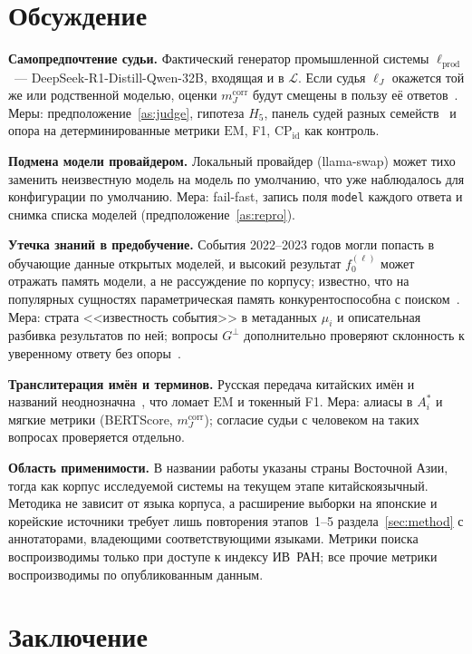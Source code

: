 \documentclass{article}
\newcommand{\Lm}{\mathcal{L}}
\newcommand{\lprod}{\ell_{\mathrm{prod}}}
\newcommand{\lJ}{\ell_{J}}
\newcommand{\refuse}{\bot}                          %
\newcommand{\EM}{\mathrm{EM}}
\newcommand{\CP}{\mathrm{CP}}
\newcommand{\mcorr}{m_J^{\mathrm{corr}}}
\begin{document}
\section{Обсуждение}\label{sec:disc}

\textbf{Самопредпочтение судьи.} Фактический генератор промышленной системы $\lprod$~--- DeepSeek-R1-Distill-Qwen-32B, входящая и в $\Lm$. Если судья $\lJ$ окажется той же или родственной моделью, оценки $\mcorr$ будут смещены в пользу её ответов~\cite{panickssery2024selfpreference,li2025preference}. Меры: предположение~\ref{as:judge}, гипотеза $H_5$, панель судей разных семейств~\cite{verga2024replacing} и опора на детерминированные метрики $\EM$, F1, $\CP_{\mathrm{id}}$ как контроль.

\textbf{Подмена модели провайдером.} Локальный провайдер (llama-swap) может тихо заменить неизвестную модель на модель по умолчанию, что уже наблюдалось для конфигурации по умолчанию. Мера: fail-fast, запись поля \texttt{model} каждого ответа и снимка списка моделей (предположение~\ref{as:repro}).

\textbf{Утечка знаний в предобучение.} События 2022--2023 годов могли попасть в обучающие данные открытых моделей, и высокий результат $f_0^{(\ell)}$ может отражать память модели, а не рассуждение по корпусу; известно, что на популярных сущностях параметрическая память конкурентоспособна с поиском~\cite{mallen2022popqa}. Мера: страта <<известность события>> в метаданных $\mu_i$ и описательная разбивка результатов по ней; вопросы $G^{\refuse}$ дополнительно проверяют склонность к уверенному ответу без опоры~\cite{dorosario2026penalty}.

\textbf{Транслитерация имён и терминов.} Русская передача китайских имён и названий неоднозначна~\cite{vashkyavichus2020translation}, что ломает $\EM$ и токенный F1. Мера: алиасы в $A^*_i$ и мягкие метрики (BERTScore, $\mcorr$); согласие судьи с человеком на таких вопросах проверяется отдельно.

\textbf{Область применимости.} В названии работы указаны страны Восточной Азии, тогда как корпус исследуемой системы на текущем этапе китайскоязычный. Методика не зависит от языка корпуса, а расширение выборки на японские и корейские источники требует лишь повторения этапов~1--5 раздела~\ref{sec:method} с аннотаторами, владеющими соответствующими языками. Метрики поиска воспроизводимы только при доступе к индексу ИВ~РАН; все прочие метрики воспроизводимы по опубликованным данным.

\section{Заключение}\label{sec:concl}
\end{document}
